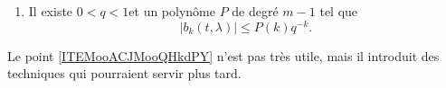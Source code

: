 \begin{proposition}
\begin{enumerate}
		      nous avons
		      \begin{equation}
			      g(t,\lambda)=\sum_{k=0}^{\infty}\sum_{\alpha\in\Lambda_k}\theta(\alpha)\frac{ a_{k-1,(\alpha_1-1,\alpha')} }{ \alpha_1+1 }(t,\lambda)^{\alpha}.
		      \end{equation}
		\item		\label{ITEMooACJMooQHkdPY}
		      Il existe \( 0<q<1\)et un polynôme \( P\) de degré \( m-1\) tel que
		      \begin{equation}
			      | b_k(t,\lambda) |\leq P(k)q^{-k}.
		      \end{equation}
	\end{enumerate}
	Le point \ref{ITEMooACJMooQHkdPY} n'est pas très utile, mais il introduit des techniques qui pourraient servir plus tard.
\end{proposition}

